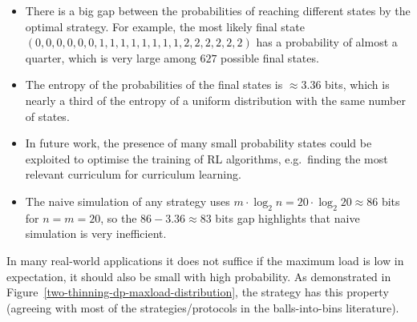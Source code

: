\begin{itemize}
    \item There is a big gap between the probabilities of reaching different states by the optimal strategy. For example, the most likely final state $(0, 0, 0, 0, 0, 0, 1, 1, 1, 1, 1, 1, 1, 1, 2, 2, 2, 2, 2, 2)$ has a probability of almost a quarter, which is very large among $627$ possible final states.
    \item The entropy of the probabilities of the final states is $\approx 3.36$ bits, which is nearly a third of the entropy of a uniform distribution with the same number of states.
    \item In future work, the presence of many small probability states could be exploited to optimise the training of RL algorithms, e.g.\ finding the most relevant curriculum for curriculum learning.
    \item The naive simulation of any strategy uses $m\cdot \log_2 n=20\cdot \log_2 20\approx 86$ bits for $n=m=20$, so the $86-3.36\approx 83$ bits gap highlights that naive simulation is very inefficient.
\end{itemize}


In many real-world applications it does not suffice if the maximum load is low in expectation, it should also be small with high probability. As demonstrated in Figure~\ref{two-thinning-dp-maxload-distribution}, the \DP strategy has this property (agreeing with most of the strategies/protocols in the balls-into-bins literature).

